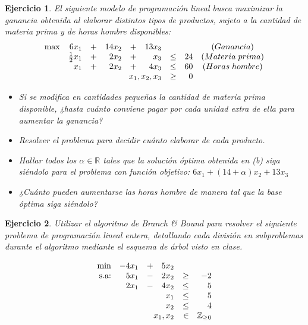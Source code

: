 \documentclass[a4paper,oneside,12pt]{amsart}
\newtheorem{quest}{Ejercicio}
\begin{document}


\begin{quest}
El siguiente modelo de programación lineal busca maximizar la ganancia obtenida al elaborar distintos tipos de productos, sujeto a la cantidad de materia prima y de horas hombre disponibles:
\[\begin{array}{rrrrrrrrc}
    \max & 6x_1 & + & 14x_2 & + & 13x_3 & & & (Ganancia)  \\
     & \frac{1}{2}x_1 & + & 2x_2 & + & x_3 & \leq & 24 & (Materia\; prima) \\
     & x_1 & + & 2x_2 & + & 4x_3 & \leq & 60 & (Horas \; hombre) \\
     & \multicolumn{5}{r}{x_1,x_2,x_3} & \geq & 0
\end{array}
\]
\begin{itemize}
    \item[(a)] Si se modifica en cantidades pequeñas la cantidad de materia prima disponible, ¿hasta cuánto conviene pagar por cada unidad extra de ella para aumentar la ganancia?
    \item[(b)] Resolver el problema para decidir cuánto elaborar de cada producto.
    \item[(c)] Hallar todos los $\alpha\in\mathbb{R}$ tales que la solución óptima obtenida en (b) siga siéndolo para el problema con función objetivo: $6x_1+(14+\alpha )x_2+13x_3$
    \item[(d)] ¿Cuánto pueden aumentarse las horas hombre de manera tal que la base óptima siga siéndolo?
\end{itemize}
\end{quest}




\begin{quest} 
Utilizar el algoritmo de Branch \& Bound para resolver el siguiente problema de programaci\'on lineal entera, detallando cada divisi\'on en subproblemas durante el algoritmo mediante el esquema de \'arbol visto en clase.   

\[\begin{array}{rrrrrrrrc}
\min & -4x_1 & + & 5x_2 &  &   \\
\text{s.a:}	 & 5x_1 & - & 2x_2 & \geq & -2  \\
			 & 2x_1 & - & 4x_2 & \leq & 5 \\
			 &	    &   & x_1 & \leq & 5 \\
			 &	    &   & x_2 & \leq & 4 \\
			 & \multicolumn{3}{r}{x_1,x_2} & \in & \mathbb{Z}_{\geq 0}
\end{array}
\]



\end{quest}
\end{document}
